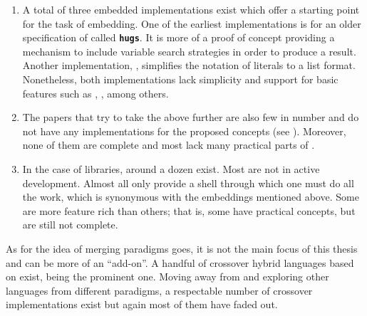 \documentclass[thesis-solanki.tex]{subfiles}
\begin{document}
\begin{enumerate}
\item
  A total of three embedded implementations exist which offer a starting point for the task of embedding.
  One of the earliest implementations \cite{website:mini-prolog-hugs98} is for an older specification of
   called  \texttt{\bfseries{hugs}}.
  It is more of a proof of concept providing a mechanism to include variable search strategies in order to produce
  a result.
  Another implementation, \cite{website:takashi-workplace}, simplifies the notation of  literals to a list format.
  Nonetheless, both implementations lack simplicity and support for basic  features such as
  ,
  ,
  among others.

\begin{comment}
\item
  Only two embeddings exist, one of them is old and made for \texttt{\bfseries{hugs}} a functional programming
  system based on the \progLang{Haskell 98} specification.
  It is complex and also lacks a lot of \progLang{Prolog} like\eref{language-like} features including \textit{cuts, fails, assert}
  among others.
  The second one is based off the first one to make it simple but it loses the variable search strategy support
  which allows the programmer to choose the manner in which a solution is produced.
\end{comment}

\item
  The papers that try to take the above further are also few in number and do not have any implementations for the
  proposed concepts (see \cite{spivey1999embedding, seres1999algebra, seres2001algebra, spivey2000functional,
    seres2000optimisation}).
  Moreover, none of them are complete and most lack many practical parts of .

\item
  In the case of libraries, around a dozen exist.
  Most are not in active development.
  Almost all only provide a shell through which one must do all the work, which is synonymous with
  the embeddings mentioned above.
  Some are more feature rich than others; that is, some have practical  concepts,
  but are still not complete.

\end{enumerate}

As for the idea of merging paradigms goes, it is not the main focus of this thesis and can be more of an
``add-on''.
A handful of crossover hybrid languages based on  exist,
 \cite{website:curry} being the prominent one.
Moving away from  and exploring other languages from different paradigms, a respectable number of
crossover implementations exist but again most of them have faded out.
\end{document}
